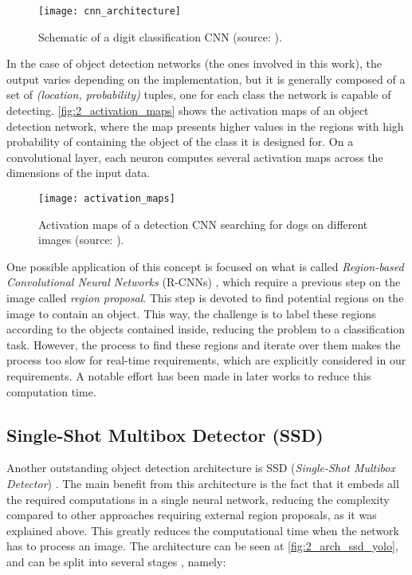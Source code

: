 \begin{figure}[h]
	\centering
	\texttt{[image: cnn\_architecture]}
	\caption{Schematic of a digit classification CNN (source: \cite{tfg}).}
	\label{fig:2_cnn}
\end{figure}


In the case of object detection networks (the ones involved in this work), the output varies depending on the implementation, but it is generally composed of a set of \textit{(location, probability)} tuples, one for each class the network is capable of detecting. \autoref{fig:2_activation_maps} shows the activation maps of an object detection network, where the map presents higher values in the regions with high probability of containing the object of the class it is designed for. On a convolutional layer, each neuron computes several activation maps across the dimensions of the input data.

\begin{figure}[h]
	\centering
	\texttt{[image: activation\_maps]}
	\caption{Activation maps of a detection CNN searching for dogs on different images (source: \cite{tfg}).}
	\label{fig:2_activation_maps}
\end{figure}


One possible application of this concept is focused on what is called \textit{Region-based Convolutional Neural Networks} (R-CNNs) \cite{rcnn}, which require a previous step on the image called \textit{region proposal}. This step is devoted to find potential regions on the image to contain an object. This way, the challenge is to label these regions according to the objects contained inside, reducing the problem to a classification task. However, the process to find these regions and iterate over them makes the process too slow for real-time requirements, which are explicitly considered in our requirements. A notable effort has been made in later works \cite{fastrcnn} \cite{spp} to reduce this computation time.\\



\subsection{Single-Shot Multibox Detector (SSD)}
\label{sec:2_ssd}
Another outstanding object detection architecture is SSD (\textit{Single-Shot Multibox Detector}) \cite{ssd}. The main benefit from this architecture is the fact that it embeds all the required computations in a single neural network, reducing the complexity compared to other approaches requiring external region proposals, as it was explained above. This greatly reduces the computational time when the network has to process an image. The architecture can be seen at \autoref{fig:2_arch_ssd_yolo}, and can be split into several stages \cite{tfg}, namely:

